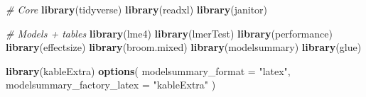 \documentclass[
  10pt,
]{article}
\newenvironment{Shaded}{\begin{snugshade}}{\end{snugshade}}
\newcommand{\AttributeTok}[1]{\textcolor[rgb]{0.13,0.29,0.53}{#1}}
\newcommand{\CommentTok}[1]{\textcolor[rgb]{0.56,0.35,0.01}{\textit{#1}}}
\newcommand{\FunctionTok}[1]{\textcolor[rgb]{0.13,0.29,0.53}{\textbf{#1}}}
\newcommand{\NormalTok}[1]{#1}
\newcommand{\StringTok}[1]{\textcolor[rgb]{0.31,0.60,0.02}{#1}}
\begin{document}
\begin{Shaded}
\begin{Highlighting}[]
\CommentTok{\# Core}
\FunctionTok{library}\NormalTok{(tidyverse)}
\FunctionTok{library}\NormalTok{(readxl)}
\FunctionTok{library}\NormalTok{(janitor)}

\CommentTok{\# Models + tables}
\FunctionTok{library}\NormalTok{(lme4)}
\FunctionTok{library}\NormalTok{(lmerTest)}
\FunctionTok{library}\NormalTok{(performance)}
\FunctionTok{library}\NormalTok{(effectsize)}
\FunctionTok{library}\NormalTok{(broom.mixed)}
\FunctionTok{library}\NormalTok{(modelsummary)}
\FunctionTok{library}\NormalTok{(glue)}

\FunctionTok{library}\NormalTok{(kableExtra)}
\FunctionTok{options}\NormalTok{(}
  \AttributeTok{modelsummary\_format =} \StringTok{"latex"}\NormalTok{,}
  \AttributeTok{modelsummary\_factory\_latex =} \StringTok{"kableExtra"}
\NormalTok{)}
\end{Highlighting}
\end{Shaded}
\end{document}
